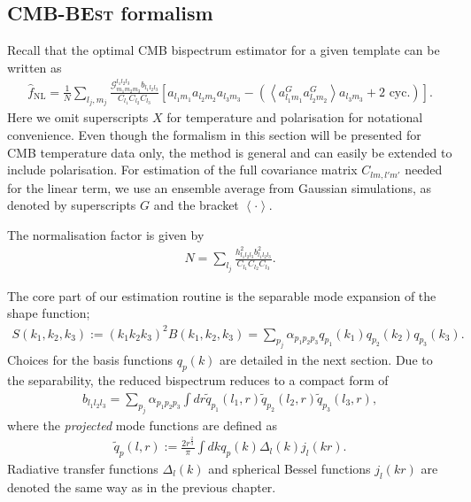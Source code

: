 \subsection{\textsc{CMB-BEst} formalism}
Recall that the optimal CMB bispectrum estimator for a given template can be written as
\begin{align}
	\hat{f}_\text{NL} = \frac{1}{N} \sum_{l_j,m_j} \frac{\mathcal{G}^{l_1 l_2 l_3}_{m_1 m_2 m_3} b_{l_1 l_2 l_3}}{C_{l_1} C_{l_2} C_{l_3}} \left[ a_{l_1 m_1} a_{l_2 m_2} a_{l_3 m_3} - \left( \left< a^G_{l_1 m_1} a^G_{l_2 m_2} \right> a_{l_3 m_3} + \text{2\ cyc.} \right)  \right].		\label{eqn:bispectrum_estimator_standard}
\end{align}
Here we omit superscripts $X$ for temperature and polarisation for notational convenience. Even though the formalism in this section will be presented for CMB temperature data only, the method is general and can easily be extended to include polarisation. For estimation of the full covariance matrix $C_{lm,l'm'}$ needed for the linear term, we use an ensemble average from Gaussian simulations, as denoted by superscripts $G$ and the bracket $\left<\cdot\right>$.

The normalisation factor is given by
\begin{align}
	N = \sum_{l_j} \frac{h_{l_1 l_2 l_3}^2 b_{l_1 l_2 l_3}^2}{C_{l_1} C_{l_2} C_{l_3}}.
\end{align}

The core part of our estimation routine is the separable mode expansion of the shape function;
\begin{align}
	S(k_1, k_2, k_3) := (k_1 k_2 k_3)^2 B(k_1, k_2, k_3) = \sum_{p_j} \alpha_{p_1 p_2 p_3} q_{p_1}(k_1) q_{p_2}(k_2) q_{p_3}(k_3).
\end{align}
Choices for the basis functions $q_p(k)$ are detailed in the next section. Due to the separability, the reduced bispectrum reduces to a compact form of
\begin{align}
	b_{l_1 l_2 l_3} = \sum_{p_j} \alpha_{p_1 p_2 p_3} \int dr \tilde{q}_{p_1}(l_1,r) \tilde{q}_{p_2}(l_2,r) \tilde{q}_{p_3}(l_3,r),
\end{align}
where the \textit{projected} mode functions are defined as
\begin{align}
	\tilde{q}_{p}(l,r) := \frac{2r^\frac{2}{3}}{\pi} \int dk q_p(k) \Delta_l(k) j_l (kr).
\end{align}
Radiative transfer functions $\Delta_l(k)$ and spherical Bessel functions $j_l(kr)$ are denoted the same way as in the previous chapter.

